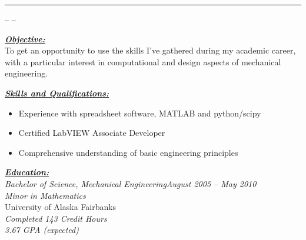 \documentclass[10pt, letterpaper]{article}
\author{Joshua Holbrook}
\renewcommand{\section}[1]{\bigskip\Large\textbf{\underline{\textit{#1}}}\normalsize\\} %
\begin{document}
\textbf{\Huge \theauthor }\hrule
\smallskip\small \theaddress -- \phonenumber -- \emailaddress \normalsize

\section{Objective:}

\small To get an opportunity to use the skills I've gathered during my academic career,
with a particular interest in computational and design aspects of mechanical
engineering.\normalsize


\section{Skills and Qualifications:}
\small\begin{itemize}
\item Experience with spreadsheet software, MATLAB and python/scipy
\item Certified LabVIEW Associate Developer
\item Comprehensive understanding of basic engineering principles
\end{itemize}\normalsize


\section{Education:}

\large\textit{Bachelor of Science, Mechanical Engineering\hfill August 2005 -- May 2010}\normalsize \\
\textit{Minor in Mathematics}\\
University of Alaska Fairbanks\\
\textit{Completed 143 Credit Hours}\\
\textit{3.67 GPA (expected)}
\end{document}
